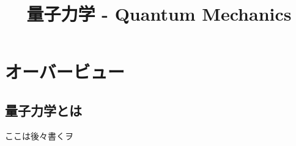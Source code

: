\documentclass[a4paper]{jsreport}
\title{量子力学 - Quantum Mechanics}
\begin{document}
    \maketitle

    \tableofcontents

    \chapter{オーバービュー}
        \section{量子力学とは}
            ここは後々書くヲ
\end{document}
